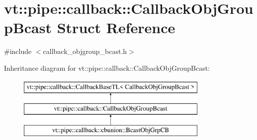 \hypertarget{structvt_1_1pipe_1_1callback_1_1_callback_obj_group_bcast}{}\section{vt\+:\+:pipe\+:\+:callback\+:\+:Callback\+Obj\+Group\+Bcast Struct Reference}
\label{structvt_1_1pipe_1_1callback_1_1_callback_obj_group_bcast}


{\ttfamily \#include $<$callback\+\_\+objgroup\+\_\+bcast.\+h$>$}

Inheritance diagram for vt\+:\+:pipe\+:\+:callback\+:\+:Callback\+Obj\+Group\+Bcast\+:\begin{figure}[H]
\begin{center}
\leavevmode
\includegraphics[height=3.000000cm]{structvt_1_1pipe_1_1callback_1_1_callback_obj_group_bcast}
\end{center}
\end{figure}
